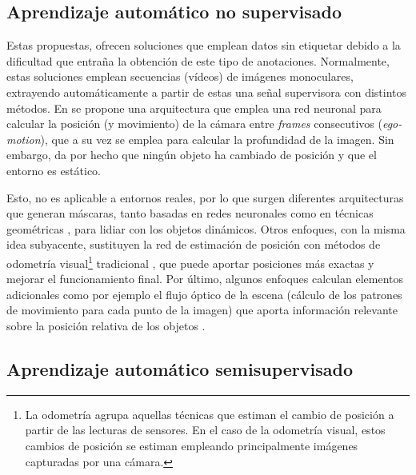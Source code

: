

\subsection{Aprendizaje automático no supervisado}

Estas propuestas, ofrecen soluciones que emplean datos sin etiquetar debido a la dificultad que entraña la obtención de este tipo de anotaciones. Normalmente, estas soluciones emplean secuencias (vídeos) de imágenes monoculares, extrayendo automáticamente a partir de estas una señal supervisora con distintos métodos. En \cite{zhou2017unsupervised} se propone una arquitectura que emplea una red neuronal para calcular la posición (y movimiento) de la cámara entre \textit{frames} consecutivos (\textit{ego-motion}), que a su vez se emplea para calcular la profundidad de la imagen. Sin embargo, da por hecho que ningún objeto ha cambiado de posición y que el entorno es estático. 

Esto, no es aplicable a entornos reales, por lo que surgen diferentes arquitecturas que generan máscaras, tanto basadas en redes neuronales \cite{zhou2017unsupervised, vijayanarasimhan2017sfmnet} como en técnicas geométricas \cite{geo_mask_egomotion, monodepth}, para lidiar con los objetos dinámicos. Otros enfoques, con la misma idea subyacente, sustituyen la red de estimación de posición con métodos de odometría visual\footnote{La odometría agrupa aquellas técnicas que estiman el cambio de posición a partir de las lecturas de sensores. En el caso de la odometría visual, estos cambios de posición se estiman empleando principalmente imágenes capturadas por una cámara.} tradicional \cite{visualodometryunsupervised}, que puede aportar posiciones más exactas y mejorar el funcionamiento final. Por último, algunos enfoques calculan elementos adicionales como por ejemplo el flujo óptico de la escena (cálculo de los patrones de movimiento para cada punto de la imagen) que aporta información relevante sobre la posición relativa de los objetos \cite{vijayanarasimhan2017sfmnet, geonet}. 

\subsection{Aprendizaje automático semisupervisado}

